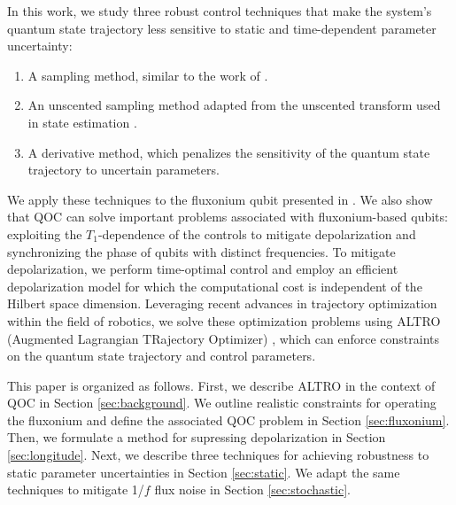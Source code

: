 In this work, we study three robust control techniques that
make the system's quantum state trajectory less sensitive
to static and time-dependent parameter uncertainty:
\begin{enumerate}
\item A sampling method, similar to the work of \cite{allen2019robust,
  ball2020software, carvalho2020error, khaneja2005optimal,
  reinhold2019controlling, rembold2020introduction}.
  \item An unscented sampling method adapted from the unscented transform used in
    state estimation \cite{howell2020direct, julier2004unscented,
      lee2013sigma, thangavel2020robust}.
  \item A derivative method, which penalizes the sensitivity of the quantum state trajectory
    to uncertain parameters.
\end{enumerate}
We apply these techniques to the fluxonium qubit presented in \cite{zhang2020universal}.
We also show that QOC can solve important problems associated with
fluxonium-based qubits: exploiting the $T_{1}$-dependence of the controls
to mitigate depolarization
and synchronizing the phase of qubits with distinct frequencies.
To mitigate depolarization,
we perform time-optimal control and
employ an efficient depolarization model
for which the computational cost is independent of the
Hilbert space dimension.
Leveraging recent advances in trajectory optimization within the field of robotics, we
solve these optimization problems using ALTRO (Augmented Lagrangian TRajectory Optimizer)
\cite{howell2019altro}, which can enforce constraints on the quantum state trajectory
and control parameters.

This paper is organized as follows.
First, we describe ALTRO in the context of QOC
in Section \ref{sec:background}.
We outline realistic constraints for operating the fluxonium and
define the associated QOC problem in Section \ref{sec:fluxonium}.
Then, we formulate a method for supressing depolarization
in Section \ref{sec:longitude}. Next, we describe three techniques for achieving
robustness to static parameter uncertainties in Section \ref{sec:static}. We
adapt the same techniques to mitigate 1/$f$ flux noise
in Section \ref{sec:stochastic}.
